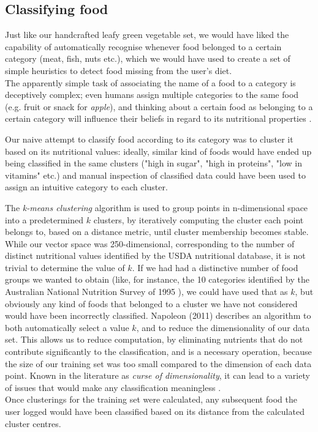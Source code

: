 \subsection{Classifying food}
Just like our handcrafted leafy green vegetable set, we would have liked the capability of automatically recognise whenever food belonged to a certain category (meat, fish, nuts etc.), which we would have used to create a set of simple heuristics to detect food missing from the user's diet. \\
The apparently simple task of associating the name of a food to a category is deceptively complex; even humans assign multiple categories to the same food (e.g. fruit or snack for \textit{apple}), and thinking about a certain food as belonging to a certain category will influence their beliefs in regard to its nutritional properties \cite{Hayes2011}.

Our naive attempt to classify food  according to its category was to cluster it based on its nutritional values: ideally, similar kind of foods would have ended up being classified in the same clusters ("high in sugar", "high in proteins", "low in vitamins" etc.) and manual inspection of classified data could have been used to assign an intuitive category to each cluster. 

The \textit{k-means clustering} algorithm is used to group points in n-dimensional space into a predetermined $k$ clusters, by iteratively computing the cluster each point belongs to, based on a distance metric, until cluster membership becomes stable.\\
While our vector space was 250-dimensional, corresponding to the number of distinct nutritional values identified by the USDA nutritional database, it is not trivial to determine the value of $k$. If we had had a distinctive number of food groups we wanted to obtain (like, for instance, the 10 categories identified by the Australian National Nutrition Survey of 1995 \cite{NNS1995}), we could have used that as $k$, but obviously any kind of foods that belonged to a cluster we have not considered would have been incorrectly classified. Napoleon (2011)\cite{napoleon} describes an algorithm to both automatically select a value $k$, and to reduce the dimensionality of our data set. This allows us to reduce computation, by eliminating nutrients that do not contribute significantly to the classification, and is a necessary operation, because the size of our training set was too small compared to the dimension of each data point. Known in the literature as \textit{curse of dimensionality}, it can lead to a variety of issues that would make any classification meaningless \cite{kriegel2009}.\\
Once clusterings for the training set were calculated, any subsequent food the user logged would have been classified based on its distance from the calculated cluster centres.

